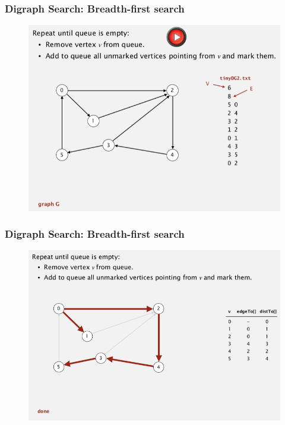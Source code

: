 \documentclass[11pt]{beamer}
\begin{document}
 \begin{frame}
	\frametitle	{Digraph Search: Breadth-first search} 
	\begin{figure}
		\centering
		\includegraphics[width=0.9\linewidth]{"Screenshot 2020-12-03 at 7.16.45 AM"}
		\label{fig:screenshot-2020-12-03-at-7}
	\end{figure}	
\end{frame}

 \begin{frame}
	\frametitle	{Digraph Search: Breadth-first search} 
	\begin{figure}
		\centering
		\includegraphics[width=0.9\linewidth]{"Screenshot 2020-12-03 at 7.16.59 AM"}
		\label{fig:screenshot-2020-12-03-at-7}
	\end{figure}	
\end{frame}
\end{document}
